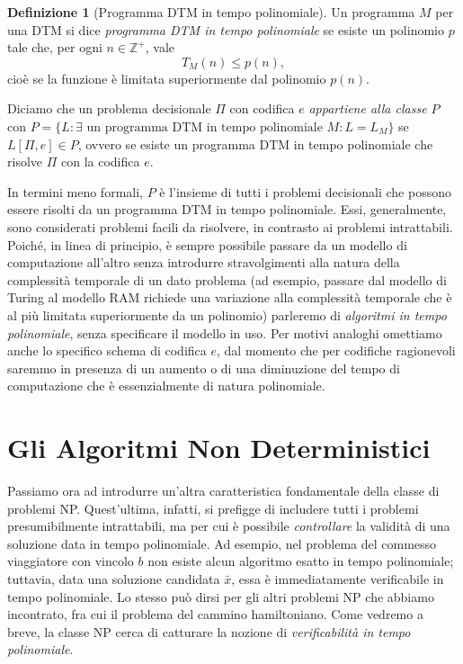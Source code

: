 \documentclass[10pt]{\classname}
\theoremstyle{newlinethm}
\theoremstyle{theorem}
\theoremstyle{definition}
\newtheorem{definizione}{Definizione}[section]
\theoremstyle{definition}
\theoremstyle{definition}
\theoremstyle{definition}
\begin{document}
\begin{definizione}[Programma DTM in tempo polinomiale]
    Un programma $M$ per una DTM si dice \emph{programma DTM in tempo polinomiale} se esiste un polinomio $p$ tale che, per ogni $n \in \mathbb Z^+$, vale \[T_M(n) \leq p(n),\] cioè se la funzione è limitata superiormente dal polinomio $p(n)$.

    Diciamo che un problema decisionale $\Pi$ con codifica $e$ \emph{appartiene alla classe $P$} con $P = \{L : \exists \mbox{ un programma DTM in tempo polinomiale } M : L=L_M\}$ se $L[\Pi, e] \in P$, ovvero se esiste un programma DTM in tempo polinomiale che risolve $\Pi$ con la codifica $e$.
\end{definizione}

In termini meno formali, $P$ è l'insieme di tutti i problemi decisionali che possono essere risolti da un programma DTM in tempo polinomiale. Essi, generalmente, sono considerati problemi facili da risolvere, in contrasto ai problemi intrattabili. Poiché, in linea di principio, è sempre possibile passare da un modello di computazione all'altro senza introdurre stravolgimenti alla natura della complessità temporale di un dato problema (ad esempio, passare dal modello di Turing al modello RAM richiede una variazione alla complessità temporale che è al più limitata superiormente da un polinomio) parleremo di \emph{algoritmi in tempo polinomiale}, senza specificare il modello in uso. Per motivi analoghi omettiamo anche lo specifico schema di codifica $e$, dal momento che per codifiche ragionevoli saremmo in presenza di un aumento o di una diminuzione del tempo di computazione che è essenzialmente di natura polinomiale.

\section{Gli Algoritmi Non Deterministici}

Passiamo ora ad introdurre un'altra caratteristica fondamentale della classe di problemi NP. Quest'ultima, infatti, si prefigge di includere tutti i problemi presumibilmente intrattabili, ma per cui è possibile \emph{controllare} la validità di una soluzione data in tempo polinomiale. Ad esempio, nel problema del commesso viaggiatore con vincolo $b$ non esiste alcun algoritmo esatto in tempo polinomiale; tuttavia, data una soluzione candidata $\bar x$, essa è immediatamente verificabile in tempo polinomiale. Lo stesso può dirsi per gli altri problemi NP che abbiamo incontrato, fra cui il problema del cammino hamiltoniano. Come vedremo a breve, la classe NP cerca di catturare la nozione di \emph{verificabilità in tempo polinomiale}.
\end{document}
